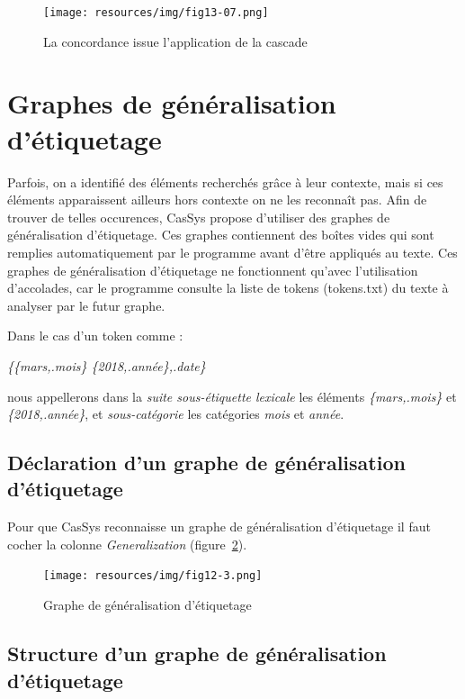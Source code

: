 \begin{figure}[!htb]
  \centering
  \texttt{[image: resources/img/fig13-07.png]}
  \caption{La concordance issue l'application de la cascade}
  \label{fig13-07}
\end{figure}

\section{Graphes de g\'{e}n\'{e}ralisation d'\'{e}tiquetage}
\label{section:graphe_generalisation}

Parfois, on a identifi\'{e} des \'{e}l\'{e}ments recherch\'{e}s gr\^{a}ce \`{a} leur contexte, mais si ces \'{e}l\'{e}ments apparaissent ailleurs hors contexte on ne les reconna\^{i}t pas. Afin de trouver de telles occurences, CasSys propose d'utiliser des graphes de g\'{e}n\'{e}ralisation d'\'{e}tiquetage. Ces graphes contiennent des bo\^{i}tes vides qui sont remplies automatiquement par le programme avant d'\^{e}tre appliqu\'{e}s au texte. Ces graphes de g\'{e}n\'{e}ralisation d'\'{e}tiquetage ne fonctionnent qu'avec l'utilisation d'accolades, car le programme consulte la liste de tokens (tokens.txt) du texte \`{a} analyser par le futur graphe.

Dans le cas d'un token comme :

\emph{\{\{mars,.mois\} \{2018,.année\},.date\}}

nous appellerons dans la \emph{suite sous-étiquette lexicale} les éléments \emph{\{mars,.mois\}} et \emph{\{2018,.année\}}, et \emph{sous-catégorie} les catégories \textit{mois} et \textit{année}.

\subsection{D\'{e}claration d'un graphe de g\'{e}n\'{e}ralisation d'\'{e}tiquetage}
Pour que CasSys reconnaisse un graphe de g\'{e}n\'{e}ralisation d'\'{e}tiquetage il faut cocher la colonne \emph{Generalization} (figure~\ref{fig12-3}).
\begin{figure}[!htb]
  \centering
  \texttt{[image: resources/img/fig12-3.png]}
  \caption{Graphe de g\'{e}n\'{e}ralisation d'\'{e}tiquetage}
  \label{fig12-3}
\end{figure}

\subsection{Structure d'un graphe de g\'{e}n\'{e}ralisation d'\'{e}tiquetage}

